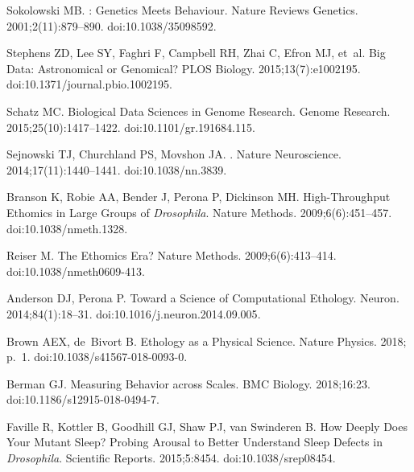 \documentclass[10pt,letterpaper]{article}\usepackage[]{graphicx}\usepackage[]{color}
\begin{document}
\begin{thebibliography}{10}
	
	Sokolowski MB.
	: {{Genetics}} Meets Behaviour.
	\newblock Nature Reviews Genetics. 2001;2(11):879--890.
	\newblock doi:{10.1038/35098592}.
	
	Stephens ZD, Lee SY, Faghri F, Campbell RH, Zhai C, Efron MJ, et~al.
	\newblock Big {{Data}}: {{Astronomical}} or {{Genomical}}?
	\newblock PLOS Biology. 2015;13(7):e1002195.
	\newblock doi:{10.1371/journal.pbio.1002195}.
	
	Schatz MC.
	\newblock Biological Data Sciences in Genome Research.
	\newblock Genome Research. 2015;25(10):1417--1422.
	\newblock doi:{10.1101/gr.191684.115}.
	
	Sejnowski TJ, Churchland PS, Movshon JA.
	.
	\newblock Nature Neuroscience. 2014;17(11):1440--1441.
	\newblock doi:{10.1038/nn.3839}.
	
	Branson K, Robie AA, Bender J, Perona P, Dickinson MH.
	\newblock High-Throughput Ethomics in Large Groups of {{{\emph{Drosophila}}}}.
	\newblock Nature Methods. 2009;6(6):451--457.
	\newblock doi:{10.1038/nmeth.1328}.
	
	Reiser M.
	\newblock The Ethomics Era?
	\newblock Nature Methods. 2009;6(6):413--414.
	\newblock doi:{10.1038/nmeth0609-413}.
	
	Anderson DJ, Perona P.
	\newblock Toward a {{Science}} of {{Computational Ethology}}.
	\newblock Neuron. 2014;84(1):18--31.
	\newblock doi:{10.1016/j.neuron.2014.09.005}.
	
	Brown AEX, de~Bivort B.
	\newblock Ethology as a Physical Science.
	\newblock Nature Physics. 2018; p.~1.
	\newblock doi:{10.1038/s41567-018-0093-0}.
	
	Berman GJ.
	\newblock Measuring Behavior across Scales.
	\newblock BMC Biology. 2018;16:23.
	\newblock doi:{10.1186/s12915-018-0494-7}.
	
	Faville R, Kottler B, Goodhill GJ, Shaw PJ, {van Swinderen} B.
	\newblock How Deeply Does Your Mutant Sleep? {{Probing}} Arousal to Better
	Understand Sleep Defects in {{{\emph{Drosophila}}}}.
	\newblock Scientific Reports. 2015;5:8454.
	\newblock doi:{10.1038/srep08454}.
	

\end{thebibliography}
\end{document}
